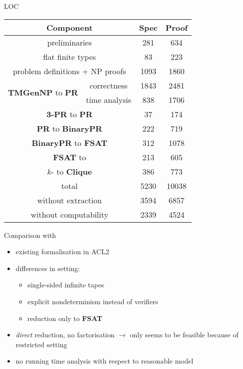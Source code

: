 \documentclass[11pt,usenames,dvipsnames,
hyperref={pdfencoding=auto,psdextra}]{beamer}
\newcommand*{\PR}{\textbf{PR}}
\newcommand*{\gennp}{\textbf{TMGenNP}}
\newcommand{\fsat}{\textbf{FSAT}}
\newcommand{\NP}{\textsf{NP}}
\newcommand{\Clique}{\normalfont\textbf{Clique}}
\begin{document}
\newcommand{\BPR}{\textbf{BinaryPR}}
\begin{frame}{LOC}
  \begin{center}
  \begin{tabular}{cccc}
    \multicolumn{2}{c}{Component} & Spec & Proof \\
    \midrule
    \multicolumn{2}{c}{preliminaries} & 281 & 634 \\
    \multicolumn{2}{c}{flat finite types} & 83 & 223 \\
    \multicolumn{2}{c}{problem definitions + \NP{} proofs} & 1093 & 1860\\ 
    \midrule
    \multirow{2}{*}{\gennp{} to \PR{}} & correctness & 1843 & 2481\\
     & time analysis & 838 & 1706 \\
    \multicolumn{2}{c}{\textbf{3-PR} to \PR{}} & 37 & 174 \\
    \multicolumn{2}{c}{\PR{} to \BPR{}} & 222 & 719 \\ 
    \multicolumn{2}{c}{\BPR{} to \fsat{}} & 312& 1078\\ 
    \multicolumn{2}{c}{\fsat{} to \SAT{}} & 213 & 605 \\ 
    \midrule
    \multicolumn{2}{c}{$k$-\SAT{} to \Clique{}} & 386 & 773 \\
    \midrule
      \multicolumn{2}{c}{total} & 5230 & 10038 \\
      \multicolumn{2}{c}{without extraction} & 3594 & 6857 \\
      \multicolumn{2}{c}{without computability} & 2339 & 4524



  \end{tabular}
  \end{center}

\end{frame}

\begin{frame}[allowframebreaks]{Comparison with~\cite{gamboa:cook}}
  \begin{itemize}
    \item existing formalisation in ACL2 
    \item differences in setting: 
      \begin{itemize}
        \item single-sided infinite tapes 
        \item explicit nondeterminism instead of verifiers
        \item reduction only to \fsat{}
      \end{itemize}
    \item \emph{direct} reduction, no factorisation $\rightarrow$ only seems to be feasible because of restricted setting
    \item no running time analysis with respect to reasonable model
  \end{itemize}
\end{frame}
\end{document}
